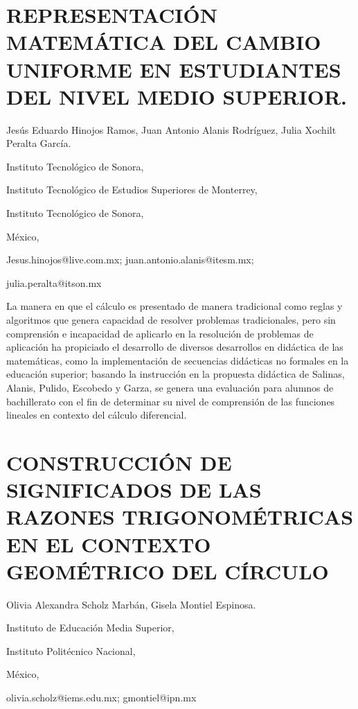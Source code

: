 \section{REPRESENTACIÓN MATEMÁTICA DEL CAMBIO UNIFORME EN ESTUDIANTES DEL
NIVEL MEDIO SUPERIOR. }

\begin{datos}

Jesús Eduardo Hinojos Ramos, Juan Antonio Alanis Rodríguez, Julia
Xochilt Peralta García. 

Instituto Tecnológico de Sonora, 

Instituto Tecnológico de Estudios Superiores de Monterrey, 

Instituto Tecnológico de Sonora, 

México,

Jesus.hinojos@live.com.mx; juan.antonio.alanis@itesm.mx; 

julia.peralta@itson.mx

\end{datos}

La manera en que el cálculo es presentado de manera tradicional como
reglas y algoritmos que genera capacidad de resolver problemas tradicionales,
pero sin comprensión e incapacidad de aplicarlo en la resolución de
problemas de aplicación ha propiciado el desarrollo de diversos desarrollos
en didáctica de las matemáticas, como la implementación de secuencias
didácticas no formales en la educación superior; basando la instrucción
en la propuesta didáctica de Salinas, Alanis, Pulido, Escobedo y Garza,
se genera una evaluación para alumnos de bachillerato con el fin de
determinar su nivel de comprensión de las funciones lineales en contexto
del cálculo diferencial.


\section{CONSTRUCCIÓN DE SIGNIFICADOS DE LAS RAZONES TRIGONOMÉTRICAS EN EL
CONTEXTO GEOMÉTRICO DEL CÍRCULO}

\begin{datos}

Olivia Alexandra Scholz Marbán, Gisela Montiel Espinosa.

Instituto de Educación Media Superior,

Instituto Politécnico Nacional, 

México,

olivia.scholz@iems.edu.mx; gmontiel@ipn.mx

\end{datos}

